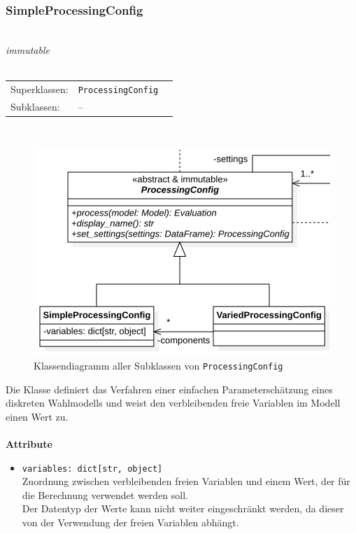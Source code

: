 \documentclass{article}
\begin{document}
\subsubsection*{\large{\textbf{SimpleProcessingConfig}\label{cls:SimpleProcessingConfig}}}\\
\textit{\flqq{}immutable\frqq}\normalsize\\\\
\begin{tabular}{lll}
 Superklassen: & \texttt{ProcessingConfig}\\
 Subklassen: & --
\end{tabular}\\
\begin{figure}[H]%
    \centering
    \includegraphics[width=13cm]{entwurf/Entwurf_dokument/img/cls/ProcessingConfigs.png}
    \caption{Klassendiagramm aller Subklassen von \texttt{ProcessingConfig}}
\end{figure}

Die Klasse definiert das Verfahren einer einfachen Parameterschätzung eines diskreten Wahlmodells und weist den verbleibenden freie Variablen im Modell einen Wert zu.
\\\\

\textbf{{Attribute}}
\begin{itemize}\setlength\itemsep{3em}
\item \texttt{variables: dict[str, object]}\\
Zuordnung zwischen verbleibenden freien Variablen und einem Wert, der für die Berechnung verwendet werden soll.\\
Der Datentyp der Werte kann nicht weiter eingeschränkt werden, da dieser von der Verwendung der freien Variablen abhängt.
\\\\
\end{itemize}
\end{document}
